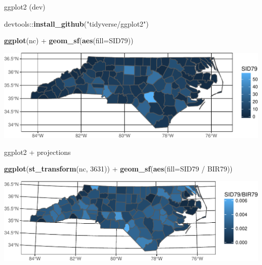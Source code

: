 \documentclass[11pt,ignorenonframetext,]{beamer}
\newenvironment{Shaded}{}{}
\newcommand{\DataTypeTok}[1]{\textcolor[rgb]{0.56,0.13,0.00}{#1}}
\newcommand{\DecValTok}[1]{\textcolor[rgb]{0.25,0.63,0.44}{#1}}
\newcommand{\KeywordTok}[1]{\textcolor[rgb]{0.00,0.44,0.13}{\textbf{#1}}}
\newcommand{\NormalTok}[1]{#1}
\newcommand{\OperatorTok}[1]{\textcolor[rgb]{0.40,0.40,0.40}{#1}}
\newcommand{\StringTok}[1]{\textcolor[rgb]{0.25,0.44,0.63}{#1}}
\let\oldShaded\Shaded
\let\endoldShaded\endShaded
\renewenvironment{Shaded}{\footnotesize\begin{spacing}{0.9}\oldShaded}{\endoldShaded\end{spacing}}
\let\oldverbatim\verbatim
\let\endoldverbatim\endverbatim
\newcommand{\scriptoutput}{
  \renewenvironment{Shaded}{\scriptsize\begin{spacing}{0.9}\oldShaded}{\endoldShaded\end{spacing}}
  \renewenvironment{verbatim}{\scriptsize\begin{spacing}{0.9}\oldverbatim}{\endoldverbatim\end{spacing}}
}
\begin{document}
\begin{frame}[fragile,t]{ggplot2 (dev)}
\protect\hypertarget{ggplot2-dev}{}

\scriptoutput

\begin{Shaded}
\begin{Highlighting}[]
\NormalTok{devtools}\OperatorTok{::}\KeywordTok{install_github}\NormalTok{(}\StringTok{"tidyverse/ggplot2"}\NormalTok{)}
\end{Highlighting}
\end{Shaded}

\begin{Shaded}
\begin{Highlighting}[]
\KeywordTok{ggplot}\NormalTok{(nc) }\OperatorTok{+}\StringTok{ }
\StringTok{  }\KeywordTok{geom_sf}\NormalTok{(}\KeywordTok{aes}\NormalTok{(}\DataTypeTok{fill=}\NormalTok{SID79))}
\end{Highlighting}
\end{Shaded}

\begin{center}\includegraphics[width=\textwidth]{Lec16_files/figure-beamer/unnamed-chunk-7-1} \end{center}

\end{frame}

\begin{frame}[fragile,t]{ggplot2 + projections}
\protect\hypertarget{ggplot2-projections}{}

\scriptoutput

\begin{Shaded}
\begin{Highlighting}[]
\KeywordTok{ggplot}\NormalTok{(}\KeywordTok{st_transform}\NormalTok{(nc, }\DecValTok{3631}\NormalTok{)) }\OperatorTok{+}\StringTok{ }
\StringTok{  }\KeywordTok{geom_sf}\NormalTok{(}\KeywordTok{aes}\NormalTok{(}\DataTypeTok{fill=}\NormalTok{SID79 }\OperatorTok{/}\StringTok{ }\NormalTok{BIR79))}
\end{Highlighting}
\end{Shaded}

\begin{center}\includegraphics[width=\textwidth]{Lec16_files/figure-beamer/unnamed-chunk-8-1} \end{center}

\end{frame}
\end{document}
